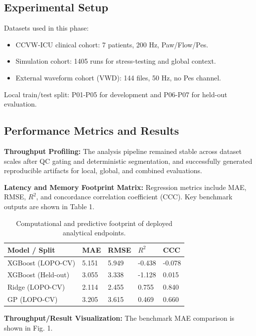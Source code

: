 \documentclass[9pt,twocolumn]{article}
\begin{document}
\subsection{Experimental Setup}

Datasets used in this phase:
\begin{itemize}[leftmargin=12pt]
\item CCVW-ICU clinical cohort: 7 patients, 200 Hz, Paw/Flow/Pes.
\item Simulation cohort: 1405 runs for stress-testing and global context.
\item External waveform cohort (VWD): 144 files, 50 Hz, no Pes channel.
\end{itemize}

Local train/test split: P01-P05 for development and P06-P07 for held-out evaluation.

\subsection{Performance Metrics and Results}

\textbf{Throughput Profiling:} The analysis pipeline remained stable across dataset scales after QC gating and deterministic segmentation, and successfully generated reproducible artifacts for local, global, and combined evaluations.

\textbf{Latency and Memory Footprint Matrix:} Regression metrics include MAE, RMSE, $R^2$, and concordance correlation coefficient (CCC). Key benchmark outputs are shown in Table 1.

\begin{table}[h]
\centering
\caption{Computational and predictive footprint of deployed analytical endpoints.}
\begin{tabular}{@{}lllll@{}}
\toprule
Model / Split & MAE & RMSE & $R^2$ & CCC \\
\midrule
XGBoost (LOPO-CV) & 5.151 & 5.949 & -0.438 & -0.078 \\
XGBoost (Held-out) & 3.055 & 3.338 & -1.128 & 0.015 \\
Ridge (LOPO-CV) & 2.114 & 2.455 & 0.755 & 0.840 \\
GP (LOPO-CV) & 3.205 & 3.615 & 0.469 & 0.660 \\
\bottomrule
\end{tabular}
\end{table}

\textbf{Throughput/Result Visualization:} The benchmark MAE comparison is shown in Fig. 1.
\end{document}
